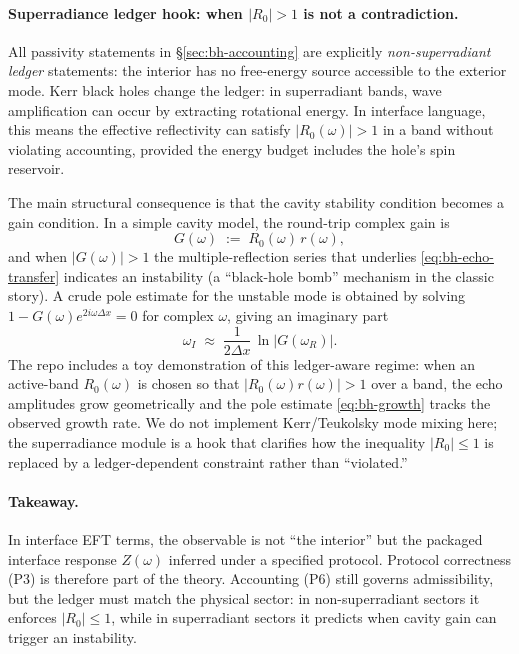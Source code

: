 \paragraph{Superradiance ledger hook: when $|R_0|>1$ is not a contradiction.}
All passivity statements in \S\ref{sec:bh-accounting} are explicitly \emph{non-superradiant ledger} statements: the interior has no free-energy source accessible to the exterior mode. Kerr black holes change the ledger: in superradiant bands, wave amplification can occur by extracting rotational energy. In interface language, this means the effective reflectivity can satisfy $|R_0(\omega)|>1$ in a band without violating accounting, provided the energy budget includes the hole's spin reservoir.

The main structural consequence is that the cavity stability condition becomes a gain condition. In a simple cavity model, the round-trip complex gain is
\begin{equation}
  G(\omega) \;:=\; R_0(\omega)\,r(\omega),
  \label{eq:bh-roundtrip-g}
\end{equation}
and when $|G(\omega)|>1$ the multiple-reflection series that underlies \eqref{eq:bh-echo-transfer} indicates an instability (a ``black-hole bomb'' mechanism in the classic story). A crude pole estimate for the unstable mode is obtained by solving $1-G(\omega)e^{2i\omega\Delta x}=0$ for complex $\omega$, giving an imaginary part
\begin{equation}
  \omega_I \;\approx\; \frac{1}{2\Delta x}\,\ln|G(\omega_R)|.
  \label{eq:bh-growth}
\end{equation}
The repo includes a toy demonstration of this ledger-aware regime: when an active-band $R_0(\omega)$ is chosen so that $|R_0(\omega)r(\omega)|>1$ over a band, the echo amplitudes grow geometrically and the pole estimate \eqref{eq:bh-growth} tracks the observed growth rate. We do not implement Kerr/Teukolsky mode mixing here; the superradiance module is a hook that clarifies how the inequality $|R_0|\le 1$ is replaced by a ledger-dependent constraint rather than ``violated.''

\paragraph{Takeaway.}
In interface EFT terms, the observable is not ``the interior'' but the packaged interface response $Z(\omega)$ inferred under a specified protocol. Protocol correctness (P3) is therefore part of the theory. Accounting (P6) still governs admissibility, but the ledger must match the physical sector: in non-superradiant sectors it enforces $|R_0|\le 1$, while in superradiant sectors it predicts when cavity gain can trigger an instability.
